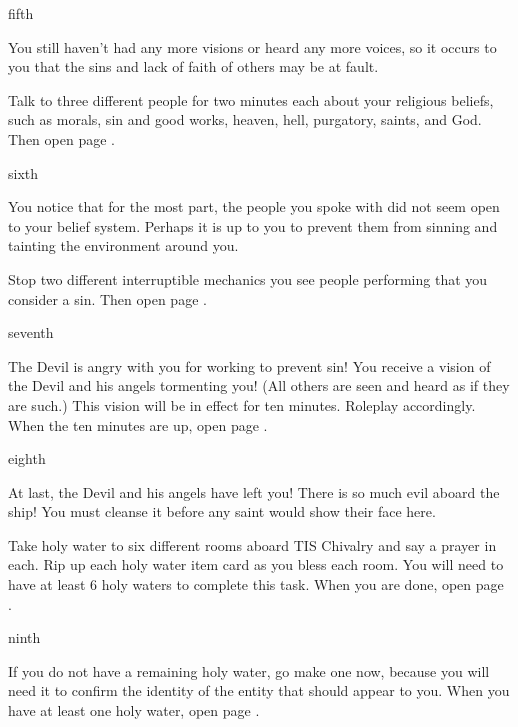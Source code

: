 \documentclass[greennotebook]{guildcamp4} %
\begin{document}
\begin{page}{fifth}

You still haven't had any more visions or heard any more voices, so it occurs to you that the sins and lack of faith of others may be at fault.

Talk to three different people for two minutes each about your religious beliefs, such as morals, sin and good works, heaven, hell, purgatory, saints, and God. Then open page .

\end{page}

\begin{page}{sixth}

You notice that for the most part, the people you spoke with did not seem open to your belief system. Perhaps it is up to you to prevent them from sinning and tainting the environment around you.

Stop two different interruptible mechanics you see people performing that you consider a sin. Then open page .

\end{page}

\begin{page}{seventh}

The Devil is angry with you for working to prevent sin! You receive a vision of the Devil and his angels tormenting you! (All others are seen and heard as if they are such.) This vision will be in effect for ten minutes. Roleplay accordingly. When the ten minutes are up, open page .

\end{page}

\begin{page}{eighth}

At last, the Devil and his angels have left you! There is so much evil aboard the ship! You must cleanse it before any saint would show their face here.

Take holy water to six different rooms aboard TIS Chivalry and say a prayer in each. Rip up each holy water item card as you bless each room. You will need to have at least 6 holy waters to complete this task. When you are done, open page .

\end{page}

\begin{page}{ninth}

If you do not have a remaining holy water, go make one now, because you will need it to confirm the identity of the entity that should appear to you. When you have at least one holy water, open page .

\end{page}
\end{document}
